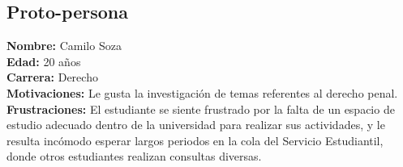 \documentclass{article}
\begin{document}
\subsection{Proto-persona}

\textbf{Nombre:} Camilo Soza \\
\textbf{Edad:} 20 años \\
\textbf{Carrera:} Derecho \\
\textbf{Motivaciones:} Le gusta la investigación de temas referentes al derecho penal. \\
\textbf{Frustraciones:} El estudiante se siente frustrado por la falta de un espacio de estudio adecuado dentro de la universidad para realizar sus actividades, y le resulta incómodo esperar largos periodos en la cola del Servicio Estudiantil, donde otros estudiantes realizan consultas diversas.
\end{document}
